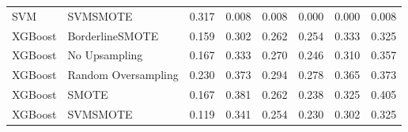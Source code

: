 \begin{tabular}{llllllll}
                            SVM &                      SVMSMOTE & 0.317 &                     0.008 &                 0.008 &                  0.000 &                                   0.000 &     0.008 \\
                        XGBoost &               BorderlineSMOTE & 0.159 &                     0.302 &                 0.262 &                  0.254 &                                   0.333 &     0.325 \\
                        XGBoost &                 No Upsampling & 0.167 &                     0.333 &                 0.270 &                  0.246 &                                   0.310 &     0.357 \\
                        XGBoost &           Random Oversampling & 0.230 &                     0.373 &                 0.294 &                  0.278 &                                   0.365 &     0.373 \\
                        XGBoost &                         SMOTE & 0.167 &                     0.381 &                 0.262 &                  0.238 &                                   0.325 &     0.405 \\
                        XGBoost &                      SVMSMOTE & 0.119 &                     0.341 &                 0.254 &                  0.230 &                                   0.302 &     0.325 \\
\bottomrule
\end{tabular}
